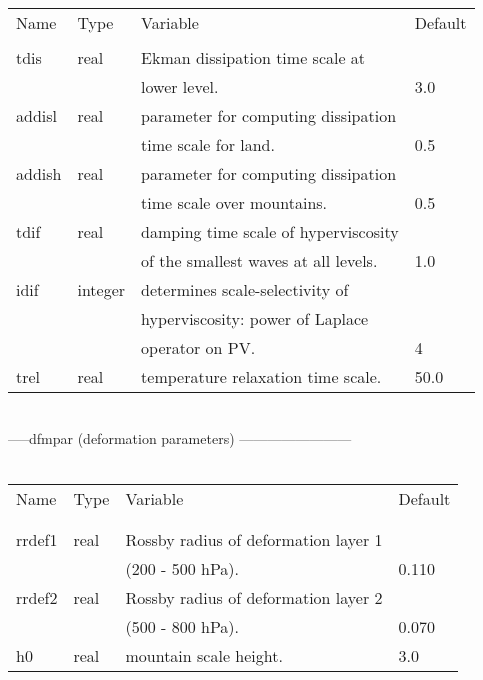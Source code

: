 \begin{tabular}{llll}
Name   &     Type   &	Variable			    &	Default    \\
\\
\hline
tdis   &     real   &	Ekman dissipation time scale at     &              \\
       &	    &	lower level.		            &	3.0        \\
addisl &     real   &	parameter for computing dissipation &              \\
       &            &	time scale for land.		    &   0.5	   \\				
addish &     real   &	parameter for computing dissipation &              \\
       &	    &   time scale over mountains.	    &	0.5        \\
tdif   &    real    &   damping time scale of hyperviscosity&              \\
       &	    &   of the smallest waves at all levels.&	1.0        \\
idif   &    integer &	determines scale-selectivity of                    \\
       &	    &   hyperviscosity: power of Laplace                   \\
       &	    &   operator on PV.			    &	4          \\
trel   &    real    &   temperature relaxation time scale.  &	50.0       \\  \hline
\end{tabular}
\\

\baselineskip=18pt
\newpage 
-----dfmpar  (deformation parameters) ------------------------    \\
\\
\begin{tabular}{llll}
Name    &    Type   &	Variable			    &   Default    \\ 
\\
\hline
\\
rrdef1	&    real   &	Rossby radius of deformation layer 1&	           \\
	&	    &   (200 - 500 hPa). 		    &	0.110      \\
rrdef2	&    real   &	Rossby radius of deformation layer 2               \\ 
	&           &   (500 - 800 hPa).		    &	0.070      \\
h0	&    real   &	mountain scale height.		    &   3.0        \\  \hline       
\end{tabular}
\\

